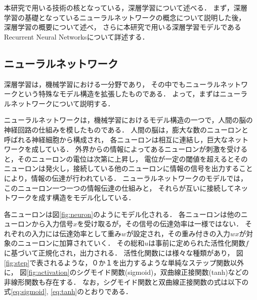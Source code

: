 本研究で用いる技術の核となっている，深層学習について述べる．
まず，深層学習の基礎となっているニューラルネットワークの概念について説明した後，
深層学習の概要について述べ，
さらに本研究で用いる深層学習モデルであるRecurrent Neural Networksについて詳述する．



\subsection{ニューラルネットワーク}
深層学習は，機械学習における一分野であり，
その中でもニューラルネットワークという特殊なモデル構造を拡張したものである．
よって，まずはニューラルネットワークについて説明する．


ニューラルネットワークは，機械学習におけるモデル構造の一つで，人間の脳の神経回路の仕組みを模したものである．
人間の脳は，膨大な数のニューロンと呼ばれる神経細胞から構成され，
各ニューロンは相互に連結し，巨大なネットワークを成している．
外界からの情報によってあるニューロンが刺激を受けると，そのニューロンの電位は次第に上昇し，
電位が一定の閾値を超えるとそのニューロンは発火し，接続している他のニューロンに情報の信号を出力することにより，情報の伝達が行われている．
ニューラルネットワークのモデルでは，
このニューロン一つ一つの情報伝達の仕組みと，
それらが互いに接続してネットワークを成す構造をモデル化している．

各ニューロンは図\ref{fig:neuron}のようにモデル化される．
各ニューロンは他のニューロンから入力信号$x$を受け取るが，その信号の伝達効率は一様ではない．
それぞれの入力には伝達効率として重み$w$が設定され，その重み付きの入力$w x$が対象のニューロンに加算されていく．
その総和$u$は事前に定められた活性化関数$f$に基づいて正規化され，出力される．
活性化関数には様々な種類があり，
図\ref{fig:step}で表されるような，０か１を出力するような単純なステップ関数以外に，
図\ref{fig:activation}のシグモイド関数(sigmoid)，双曲線正接関数(tanh)などの非線形関数も存在する．
なお，シグモイド関数と双曲線正接関数の式は以下の式\ref{eq:sigmoid}, \ref{eq:tanh}のとおりである．

